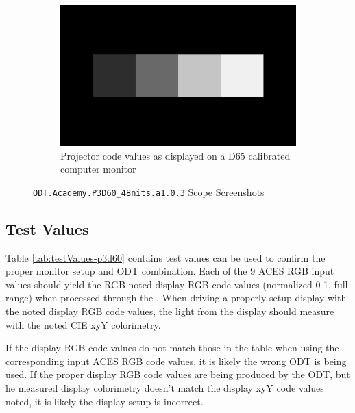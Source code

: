 \begin{figure}[ht!]
\begin{subfigure}[b]{0.475\textwidth}
            \includegraphics[width=\textwidth]{images/p3d60/p3d60_image.png}
            \caption[Projector code values as displayed on a D65 calibrated computer monitor]%
            {{\small Projector code values as displayed on a D65 calibrated computer monitor}}    
            \label{fig:cv-p3d60}
        \end{subfigure}
        \caption[]
        {\small \texttt{ODT.Academy.P3D60\_48nits.a1.0.3} Scope Screenshots} 
        \label{fig:screenshots-p3d60}
    \end{figure}

\subsection{Test Values}
\label{subsec:testValues-p3d60}

Table \ref{tab:testValues-p3d60} contains test values can be used to confirm the proper monitor setup and ODT combination.  Each of the 9 ACES RGB input values should yield the RGB noted display RGB code values (normalized 0-1, full range) when processed through the \texttt{}. When driving a properly setup display with the noted display RGB code values, the light from the display should measure with the noted CIE xyY colorimetry.  

If the display RGB code values do not match those in the table when using the corresponding input ACES RGB code values, it is likely the wrong ODT is being used.  If the proper display RGB code values are being produced by the ODT, but he measured display colorimetry doesn't match the display xyY code values noted, it is likely the display setup is incorrect.


